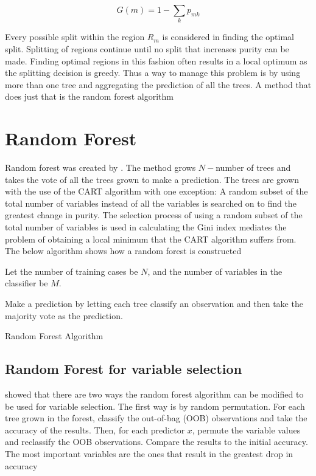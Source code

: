 \documentclass[twoside,11pt]{article}
\begin{document}
\begin{equation}
	G(m)= 1-\displaystyle\sum_k p_{mk}
\end{equation}

Every possible split within the region $R_m$ is considered in finding the optimal split. Splitting of regions continue until no split that increases purity can be made. Finding optimal regions in this fashion often results in a local optimum as the splitting decision is greedy. Thus a way to manage this problem is by using more than one tree and aggregating the prediction of all the trees. A method that does just that is the random forest algorithm

\section{Random Forest}
Random forest was created by \citet{Breiman01}. The method grows $N-$number of trees and takes the vote of all the trees grown to make a prediction. The trees are grown with the use of the CART algorithm with one exception: A random subset of the total number of variables instead of all the variables is searched on to find the greatest change in purity. The selection process of using a random subset of the total number of variables is used in calculating the Gini index mediates the problem of obtaining a local minimum that the CART algorithm suffers from. The below algorithm shows how a random forest is constructed

\begin{algorithm}
Let the number of training cases be $N$, and the number of variables in the classifier be $M$.

Make a prediction by letting each tree classify an observation and then take the majority vote as the prediction.
\caption{Random Forest Algorithm}\label{algo: RandomForest}
\end{algorithm}

\subsection{Random Forest for variable selection}
\citet{Breiman01} showed that there are two ways the random forest algorithm can be modified to be used for variable selection. The first way is by random permutation. For each tree grown in the forest, classify the out-of-bag (OOB) observations and take the accuracy of the results. Then, for each predictor $x$, permute the variable values and reclassify the OOB observations. Compare the results to the initial accuracy. The most important variables are the ones that result in the greatest drop in accuracy
\end{document}
